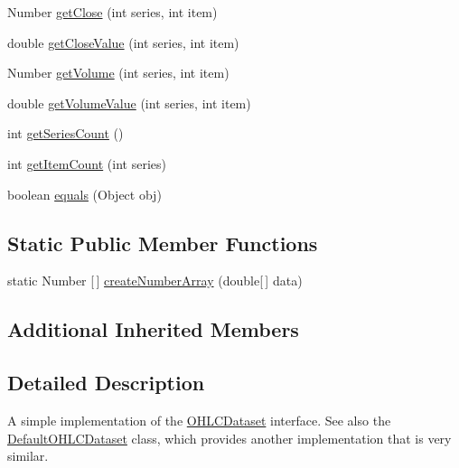 \begin{DoxyCompactItemize}
\item 
Number \mbox{\hyperlink{classorg_1_1jfree_1_1data_1_1xy_1_1_default_high_low_dataset_a12694885b103c14192fea35616c464f9}{get\+Close}} (int series, int item)
\item 
double \mbox{\hyperlink{classorg_1_1jfree_1_1data_1_1xy_1_1_default_high_low_dataset_af316dffa7faed1c0c8c2f66b7b0acf5f}{get\+Close\+Value}} (int series, int item)
\item 
Number \mbox{\hyperlink{classorg_1_1jfree_1_1data_1_1xy_1_1_default_high_low_dataset_a36d4aedaf6e8a20597f5127434bc0562}{get\+Volume}} (int series, int item)
\item 
double \mbox{\hyperlink{classorg_1_1jfree_1_1data_1_1xy_1_1_default_high_low_dataset_af97ca5089ee14cddbd768a78af00a501}{get\+Volume\+Value}} (int series, int item)
\item 
int \mbox{\hyperlink{classorg_1_1jfree_1_1data_1_1xy_1_1_default_high_low_dataset_a3fc6c7fe46f3adbb8b512c6db2e029aa}{get\+Series\+Count}} ()
\item 
int \mbox{\hyperlink{classorg_1_1jfree_1_1data_1_1xy_1_1_default_high_low_dataset_af6ef60605755d26a4cd16fcb54f1a3e3}{get\+Item\+Count}} (int series)
\item 
boolean \mbox{\hyperlink{classorg_1_1jfree_1_1data_1_1xy_1_1_default_high_low_dataset_aa020f72f901c4677bccea699e1048edb}{equals}} (Object obj)
\end{DoxyCompactItemize}
\subsection*{Static Public Member Functions}
\begin{DoxyCompactItemize}
\item 
static Number \mbox{[}$\,$\mbox{]} \mbox{\hyperlink{classorg_1_1jfree_1_1data_1_1xy_1_1_default_high_low_dataset_a57a8523a0429ec27af8f447c934e234c}{create\+Number\+Array}} (double\mbox{[}$\,$\mbox{]} data)
\end{DoxyCompactItemize}
\subsection*{Additional Inherited Members}


\subsection{Detailed Description}
A simple implementation of the \mbox{\hyperlink{interfaceorg_1_1jfree_1_1data_1_1xy_1_1_o_h_l_c_dataset}{O\+H\+L\+C\+Dataset}} interface. See also the \mbox{\hyperlink{classorg_1_1jfree_1_1data_1_1xy_1_1_default_o_h_l_c_dataset}{Default\+O\+H\+L\+C\+Dataset}} class, which provides another implementation that is very similar. 

